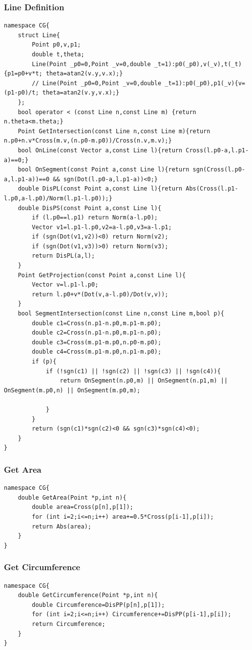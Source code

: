 \documentclass[10pt]{ctexart}
\begin{document}
{\subsubsection{Line Definition}
\begin{lstlisting}
namespace CG{
    struct Line{
        Point p0,v,p1;
        double t,theta;
        Line(Point _p0=0,Point _v=0,double _t=1):p0(_p0),v(_v),t(_t){p1=p0+v*t; theta=atan2(v.y,v.x);}
        // Line(Point _p0=0,Point _v=0,double _t=1):p0(_p0),p1(_v){v=(p1-p0)/t; theta=atan2(v.y,v.x);}
    };
    bool operator < (const Line n,const Line m) {return n.theta<m.theta;}
    Point GetIntersection(const Line n,const Line m){return n.p0+n.v*Cross(m.v,(n.p0-m.p0))/Cross(n.v,m.v);}
    bool OnLine(const Vector a,const Line l){return Cross(l.p0-a,l.p1-a)==0;}
    bool OnSegment(const Point a,const Line l){return sgn(Cross(l.p0-a,l.p1-a))==0 && sgn(Dot(l.p0-a,l.p1-a))<0;}
    double DisPL(const Point a,const Line l){return Abs(Cross(l.p1-l.p0,a-l.p0)/Norm(l.p1-l.p0));}
    double DisPS(const Point a,const Line l){
        if (l.p0==l.p1) return Norm(a-l.p0);
        Vector v1=l.p1-l.p0,v2=a-l.p0,v3=a-l.p1;
        if (sgn(Dot(v1,v2))<0) return Norm(v2);
        if (sgn(Dot(v1,v3))>0) return Norm(v3);
        return DisPL(a,l);
    }
    Point GetProjection(const Point a,const Line l){
        Vector v=l.p1-l.p0;
        return l.p0+v*(Dot(v,a-l.p0)/Dot(v,v));
    }
    bool SegmentIntersection(const Line n,const Line m,bool p){
        double c1=Cross(n.p1-n.p0,m.p1-m.p0);
        double c2=Cross(n.p1-n.p0,m.p1-n.p0);
        double c3=Cross(m.p1-m.p0,n.p0-m.p0);
        double c4=Cross(m.p1-m.p0,n.p1-m.p0);
        if (p){
            if (!sgn(c1) || !sgn(c2) || !sgn(c3) || !sgn(c4)){
                return OnSegment(n.p0,m) || OnSegment(n.p1,m) || OnSegment(m.p0,n) || OnSegment(m.p0,m);

            }
        }
        return (sgn(c1)*sgn(c2)<0 && sgn(c3)*sgn(c4)<0);
    }
}
\end{lstlisting}
\subsubsection{Get Area}
\begin{lstlisting}
namespace CG{
    double GetArea(Point *p,int n){
        double area=Cross(p[n],p[1]);
        for (int i=2;i<=n;i++) area+=0.5*Cross(p[i-1],p[i]);
        return Abs(area);
    }
}
\end{lstlisting}
\subsubsection{Get Circumference}
\begin{lstlisting}
namespace CG{
    double GetCircumference(Point *p,int n){
        double Circumference=DisPP(p[n],p[1]);
        for (int i=2;i<=n;i++) Circumference+=DisPP(p[i-1],p[i]);
        return Circumference;
    }
}
\end{lstlisting}
}
\end{document}
